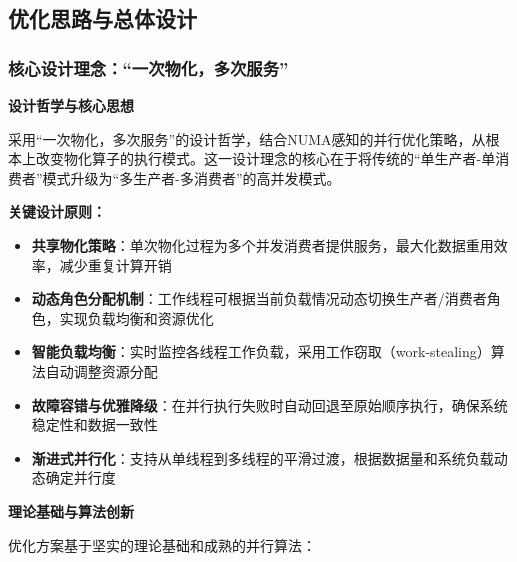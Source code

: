 \subsection{优化思路与总体设计}

\subsubsection{核心设计理念：“一次物化，多次服务”}

\textbf{设计哲学与核心思想}

采用“一次物化，多次服务”的设计哲学，结合NUMA感知的并行优化策略\cite{numa2020optimization}，从根本上改变物化算子的执行模式。这一设计理念的核心在于将传统的“单生产者-单消费者”模式升级为“多生产者-多消费者”的高并发模式。

\textbf{关键设计原则：}

\begin{itemize}
    \item \textbf{共享物化策略}：单次物化过程为多个并发消费者提供服务，最大化数据重用效率，减少重复计算开销
    \item \textbf{动态角色分配机制}：工作线程可根据当前负载情况动态切换生产者/消费者角色，实现负载均衡和资源优化
    \item \textbf{智能负载均衡}：实时监控各线程工作负载，采用工作窃取（work-stealing）算法自动调整资源分配
    \item \textbf{故障容错与优雅降级}：在并行执行失败时自动回退至原始顺序执行，确保系统稳定性和数据一致性
    \item \textbf{渐进式并行化}：支持从单线程到多线程的平滑过渡，根据数据量和系统负载动态确定并行度
\end{itemize}

\textbf{理论基础与算法创新}

优化方案基于坚实的理论基础和成熟的并行算法：

